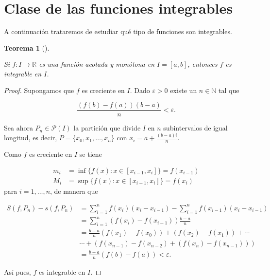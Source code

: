 \documentclass[
  a4paper,
]{scrreport}
\theoremstyle{definition}
\theoremstyle{plain}
\theoremstyle{definition}
\theoremstyle{definition}
\theoremstyle{plain}
\newtheorem{theorem}{Teorema}[chapter]
\theoremstyle{plain}
\theoremstyle{remark}
\begin{document}
\section{Clase de las funciones
integrables}\label{clase-de-las-funciones-integrables}

A continuación trataremos de estudiar qué tipo de funciones son
integrables.

\begin{theorem}[]\protect\hypertarget{thm-integrabilidad-funciones-monótonas}{}\label{thm-integrabilidad-funciones-monótonas}

Si \(f:I\to\mathbb{R}\) es una función acotada y monótona en
\(I=[a,b]\), entonces \(f\) es integrable en \(I\).

\end{theorem}

\begin{tcolorbox}[enhanced jigsaw, leftrule=.75mm, colbacktitle=quarto-callout-note-color!10!white, toprule=.15mm, opacityback=0, opacitybacktitle=0.6, toptitle=1mm, breakable, bottomtitle=1mm, colframe=quarto-callout-note-color-frame, rightrule=.15mm, titlerule=0mm, title=\textcolor{quarto-callout-note-color}{\faInfo}\hspace{0.5em}{Demostración}, arc=.35mm, left=2mm, bottomrule=.15mm, colback=white, coltitle=black]

\begin{proof}
Supongamos que \(f\) es creciente en \(I\). Dado \(\varepsilon>0\)
existe un \(n\in\mathbb{N}\) tal que

\[
\frac{(f(b)-f(a))(b-a)}{n} < \varepsilon.
\]

Sea ahora \(P_n\in\mathcal{P}(I)\) la partición que divide \(I\) en
\(n\) subintervalos de igual longitud, es decir,
\(P=\{x_0, x_1, \ldots, x_n\}\) con \(x_i = a+\frac{(b-a)i}{n}\).

Como \(f\) es creciente en \(I\) se tiene

\begin{align*}
m_i &= \inf\{f(x): x\in[x_{i-1},x_i]\} = f(x_{i-1})\\
M_i &= \sup\{f(x): x\in[x_{i-1},x_i]\} = f(x_{i})
\end{align*} para \(i=1,\ldots,n\), de manera que

\begin{align*}
S(f,P_n)-s(f,P_n) &= \sum_{i=1}^n f(x_i)(x_i-x_{i-1}) - \sum_{i=1}^n f(x_{i-1})(x_i-x_{i-1}) \\
&= \sum_{i=1}^n (f(x_i)-f(x_{i-1}))\frac{b-a}{n} \\
&= \frac{b-a}{n}(f(x_1)-f(x_0))+(f(x_2)-f(x_1))+ \cdots \\ 
& \cdots + (f(x_{n-1})-f(x_{n-2})+ (f(x_n)-f(x_{n-1}))) \\
&= \frac{b-a}{n}(f(b)-f(a)) < \varepsilon.
\end{align*}

Así pues, \(f\) es integrable en \(I\).
\end{proof}

\end{tcolorbox}
\end{document}
